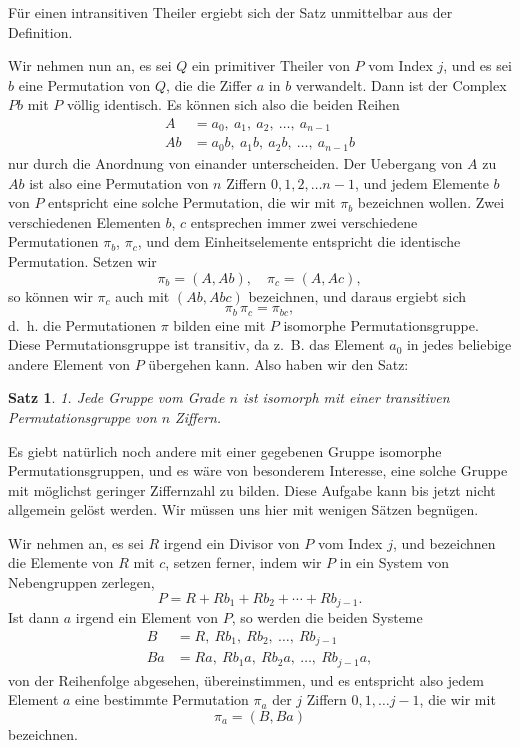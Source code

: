 \documentclass[12pt,a4paper]{article}
\theoremstyle{plain}
\newtheorem{satz}{Satz}[section]
\theoremstyle{definition}
\theoremstyle{remark}
\begin{document}
Für einen intransitiven Theiler ergiebt sich der Satz unmittelbar aus der Definition.

Wir nehmen nun an, es sei $Q$ ein primitiver Theiler von $P$ vom Index $j$, und es sei $b$ eine Permutation von $Q$, die die Ziffer $a$ in $b$ verwandelt. Dann ist der Complex $Pb$ mit $P$ völlig identisch. Es können sich also die beiden Reihen
\begin{align*}
A &= a_{0},\ a_{1},\ a_{2},\ \ldots,\ a_{n-1}\\
Ab &= a_{0}b,\ a_{1}b,\ a_{2}b,\ \ldots,\ a_{n-1}b
\end{align*}
nur durch die Anordnung von einander unterscheiden. Der Uebergang von $A$ zu $Ab$ ist also eine Permutation von $n$ Ziffern $0, 1, 2, \ldots n-1$, und jedem Elemente $b$ von $P$ entspricht eine solche Permutation, die wir mit $\pi_{b}$ bezeichnen wollen. Zwei verschiedenen Elementen $b$, $c$ entsprechen immer zwei verschiedene Permutationen $\pi_{b}$, $\pi_{c}$, und dem Einheitselemente entspricht die identische Permutation. Setzen wir
\[
\pi_{b} = (A, Ab),\quad \pi_{c} = (A, Ac),
\]
so können wir $\pi_{c}$ auch mit $(Ab, Abc)$ bezeichnen, und daraus ergiebt sich
\begin{equation}
\pi_{b}\, \pi_{c} = \pi_{bc},
\end{equation}
d.~h. die Permutationen $\pi$ bilden eine mit $P$ isomorphe Permutationsgruppe. Diese Permutationsgruppe ist transitiv, da z.~B. das Element $a_{0}$ in jedes beliebige andere Element von $P$ übergehen kann. Also haben wir den Satz:

\begin{satz}
1. Jede Gruppe vom Grade $n$ ist isomorph mit einer transitiven Permutationsgruppe von $n$ Ziffern.
\end{satz}

Es giebt natürlich noch andere mit einer gegebenen Gruppe isomorphe Permutationsgruppen, und es wäre von besonderem Interesse, eine solche Gruppe mit möglichst geringer Ziffernzahl zu bilden. Diese Aufgabe kann bis jetzt nicht allgemein gelöst werden. Wir müssen uns hier mit wenigen Sätzen begnügen.

Wir nehmen an, es sei $R$ irgend ein Divisor von $P$ vom Index $j$, und bezeichnen die Elemente von $R$ mit $c$, setzen ferner, indem wir $P$ in ein System von Nebengruppen zerlegen,
\begin{equation}
P = R + Rb_{1} + Rb_{2} + \cdots + Rb_{j-1}.
\end{equation}
Ist dann $a$ irgend ein Element von $P$, so werden die beiden Systeme
\begin{align}
B &= R,\ Rb_{1},\ Rb_{2},\ \ldots,\ Rb_{j-1}\\
Ba &= Ra,\ Rb_{1}a,\ Rb_{2}a,\ \ldots,\ Rb_{j-1}a,\nonumber
\end{align}
von der Reihenfolge abgesehen, übereinstimmen, und es entspricht also jedem Element $a$ eine bestimmte Permutation $\pi_{a}$ der $j$ Ziffern $0, 1, \ldots j-1$, die wir mit
\begin{equation}
\pi_{a} = (B, Ba)
\end{equation}
bezeichnen.
\end{document}
